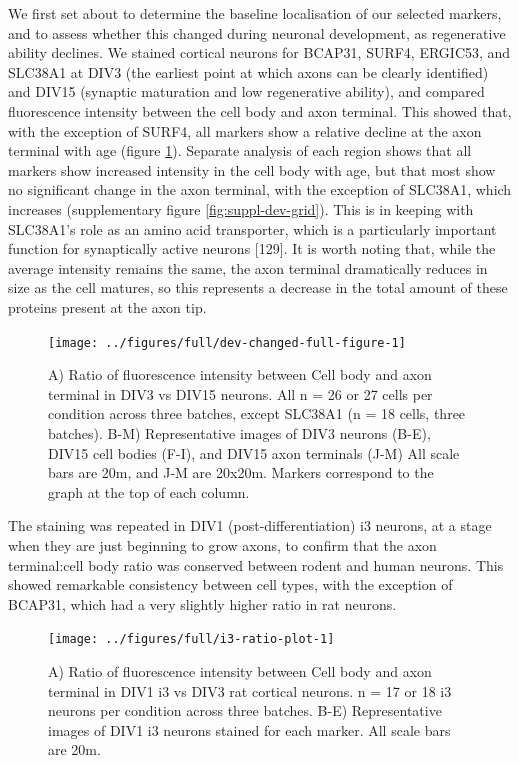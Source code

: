 \documentclass[
  12pt,
  a4paper,
]{book}
\begin{document}
We first set about to determine the baseline localisation of our selected markers, and to assess whether this changed during neuronal development, as regenerative ability declines. We stained cortical neurons for BCAP31, SURF4, ERGIC53, and SLC38A1 at DIV3 (the earliest point at which axons can be clearly identified) and DIV15 (synaptic maturation and low regenerative ability), and compared fluorescence intensity between the cell body and axon terminal. This showed that, with the exception of SURF4, all markers show a relative decline at the axon terminal with age (figure \ref{fig:dev-changed-full-figure}). Separate analysis of each region shows that all markers show increased intensity in the cell body with age, but that most show no significant change in the axon terminal, with the exception of SLC38A1, which increases (supplementary figure \ref{fig:suppl-dev-grid}). This is in keeping with SLC38A1's role as an amino acid transporter, which is a particularly important function for synaptically active neurons {[}129{]}. It is worth noting that, while the average intensity remains the same, the axon terminal dramatically reduces in size as the cell matures, so this represents a decrease in the total amount of these proteins present at the axon tip.

\begin{figure}
\texttt{[image: ../figures/full/dev-changed-full-figure-1]} \caption[Developmental changes in marker localisation in cortical neurons]{A) Ratio of fluorescence intensity between Cell body and axon terminal in DIV3 vs DIV15 neurons.  All n = 26 or 27 cells per condition across three batches, except SLC38A1 (n = 18 cells, three batches). B-M) Representative images of DIV3 neurons (B-E), DIV15 cell bodies (F-I), and DIV15 axon terminals (J-M)  All scale bars are 20\textmu{}m, and J-M are 20x20\textmu{}m.  Markers correspond to the graph at the top of each column.}\label{fig:dev-changed-full-figure}
\end{figure}

The staining was repeated in DIV1 (post-differentiation) i3 neurons, at a stage when they are just beginning to grow axons, to confirm that the axon terminal:cell body ratio was conserved between rodent and human neurons. This showed remarkable consistency between cell types, with the exception of BCAP31, which had a very slightly higher ratio in rat neurons.

\begin{figure}
\texttt{[image: ../figures/full/i3-ratio-plot-1]} \caption[Comparison of marker localisation between i3 neurons and rat cortical neurons]{A) Ratio of fluorescence intensity between Cell body and axon terminal in DIV1 i3 vs DIV3 rat cortical neurons.  n = 17 or 18 i3 neurons per condition across three batches. B-E) Representative images of DIV1 i3 neurons stained for each marker.  All scale bars are 20\textmu{}m.}\label{fig:i3-ratio-plot}
\end{figure}
\end{document}
